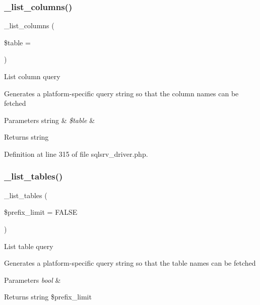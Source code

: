 \subsubsection{\texorpdfstring{\_list\_columns()}{\_list\_columns()}}
{\footnotesize\ttfamily \+\_\+list\+\_\+columns (\begin{DoxyParamCaption}\item[{}]{\$table = {\ttfamily \textquotesingle{}\textquotesingle{}} }\end{DoxyParamCaption})\hspace{0.3cm}{\ttfamily [protected]}}

List column query

Generates a platform-\/specific query string so that the column names can be fetched


\begin{DoxyParams}[1]{Parameters}
string & {\em \$table} & \\
\hline
\end{DoxyParams}
\begin{DoxyReturn}{Returns}
string 
\end{DoxyReturn}


Definition at line 315 of file sqlsrv\+\_\+driver.\+php.

\mbox{\label{class_c_i___d_b__sqlsrv__driver_a435c0f3ce54fe7daa178baa8532ebd54}} 
\subsubsection{\texorpdfstring{\_list\_tables()}{\_list\_tables()}}
{\footnotesize\ttfamily \+\_\+list\+\_\+tables (\begin{DoxyParamCaption}\item[{}]{\$prefix\+\_\+limit = {\ttfamily FALSE} }\end{DoxyParamCaption})\hspace{0.3cm}{\ttfamily [protected]}}

List table query

Generates a platform-\/specific query string so that the table names can be fetched


\begin{DoxyParams}{Parameters}
{\em bool} & \\
\hline
\end{DoxyParams}
\begin{DoxyReturn}{Returns}
string \$prefix\+\_\+limit 
\end{DoxyReturn}


